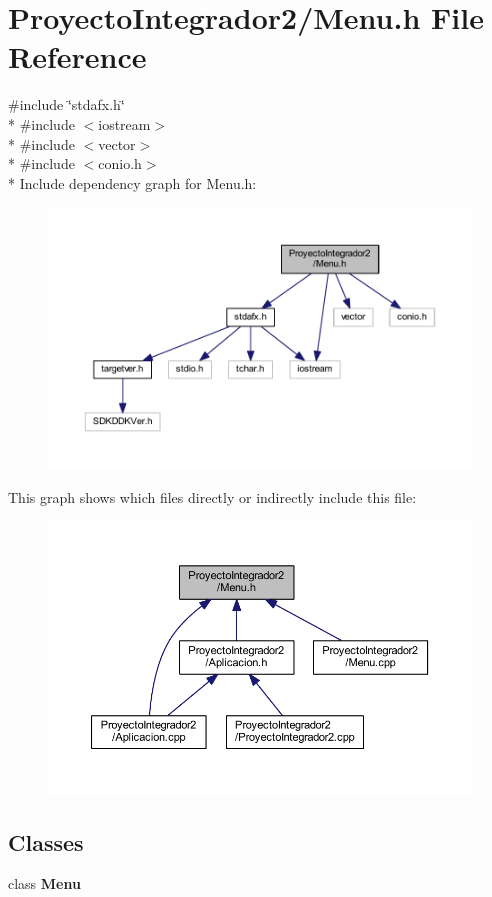 \section{Proyecto\-Integrador2/\-Menu.h File Reference}
\label{_menu_8h}
{\ttfamily \#include \char`\"{}stdafx.\-h\char`\"{}}\\*
{\ttfamily \#include $<$iostream$>$}\\*
{\ttfamily \#include $<$vector$>$}\\*
{\ttfamily \#include $<$conio.\-h$>$}\\*
Include dependency graph for Menu.\-h\-:\nopagebreak
\begin{figure}[H]
\begin{center}
\leavevmode
\includegraphics[width=350pt]{_menu_8h__incl}
\end{center}
\end{figure}
This graph shows which files directly or indirectly include this file\-:\nopagebreak
\begin{figure}[H]
\begin{center}
\leavevmode
\includegraphics[width=350pt]{_menu_8h__dep__incl}
\end{center}
\end{figure}
\subsection*{Classes}
\begin{DoxyCompactItemize}
\item 
class {\bf Menu}
\end{DoxyCompactItemize}

